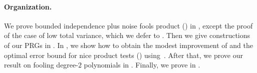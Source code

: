 \documentclass{toc}
\begin{document}
\paragraph{Organization.}
We prove bounded independence plus noise fools product () in , except the proof of the case of low total variance, which we defer to .
Then we give constructions of our PRGs in .
In , we show how to obtain the modest improvement of  and the optimal error bound for nice product tests () using~\cite{ForbesK18}.
After that, we prove our result on fooling degree-$2$ polynomials in .
Finally, we prove  in .
\end{document}
